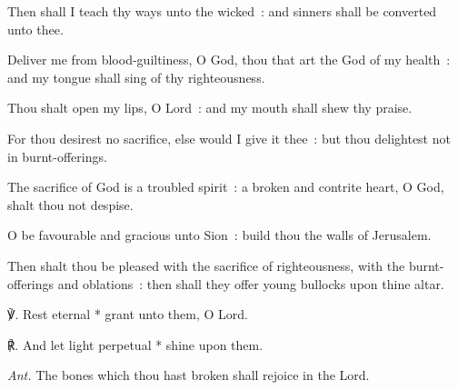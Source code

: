 Then shall I teach thy ways unto the wicked~: and sinners shall be converted unto thee.\par
{}Deliver me from blood-guiltiness, O God, thou that art the God of my health~: and my tongue shall sing of thy righteousness.\par
{}Thou shalt open my lips, O Lord~: and my mouth shall shew thy praise.\par
{}For thou desirest no sacrifice, else would I give it thee~: but thou delightest not in burnt-offerings.\par
{}The sacrifice of God is a troubled spirit~: a broken and contrite heart, O God, shalt thou not despise.\par
{}O be favourable and gracious unto Sion~: build thou the walls of Jerusalem.\par
{}Then shalt thou be pleased with the sacrifice of righteousness, with the burnt-offerings and oblations~: then shall they offer young bullocks upon thine altar.\par
℣. Rest eternal * grant unto them, O Lord.\par
℟. And let light perpetual * shine upon them.\par\noindent
\textit{Ant.} The bones which thou hast broken shall rejoice in the Lord.

